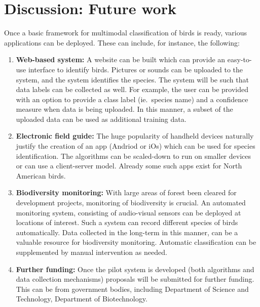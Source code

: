 \documentclass{article}
\begin{document}


\section{Discussion: Future work}

Once a basic framework for multimodal classification of birds is ready, various
applications can be deployed. These can include, for instance, the following:

\begin{enumerate}
\item \textbf{Web-based system:} A website can be built which can provide an
easy-to-use interface to identify birds. Pictures or sounds can be uploaded to
the system, and the system identifies the species. The system will be such that
data labels can be collected as well. For example, the user can be provided with
an option to provide a class label (ie.~species name) and a confidence measure
when data is being uploaded. In this manner, a subset of the uploaded data can be
used as additional training data.

\item \textbf{Electronic field guide:} The huge popularity of handheld
devices naturally justify the creation of an app (Andriod or iOs) which can be
used for species identification. The algorithms can be scaled-down to run on 
smaller devices or can use a client-server model. Already some such apps exist
for North American birds.

\item \textbf{Biodiversity monitoring:} With large areas of forest been cleared
for development projects, monitoring of biodiversity is crucial. An automated
monitoring system, consisting of audio-visual sensors can be deployed at
locations of interest. Such a system can record different species of birds
automatically. Data collected in the long-term in this manner, can be a
valuable resource for biodiversity monitoring. Automatic classification can be
supplemented by manual intervention as needed.

\item \textbf{Further funding:} Once the pilot system is developed (both
algorithms and data collection mechanisms) proposals will be submitted for further
funding. This can be from government bodies, including Department of Science and
Technology, Department of Biotechnology.

\end{enumerate}
\end{document}
